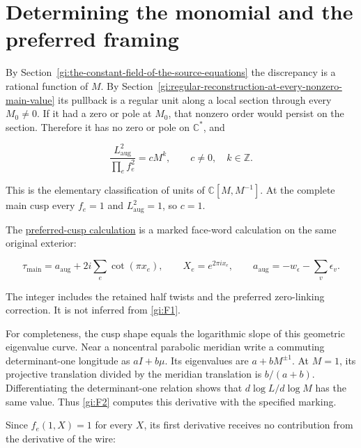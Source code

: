 \section{Determining the monomial and the preferred framing}\label{gi:determining-the-monomial-and-the-preferred-framing}

By Section~\ref{gi:the-constant-field-of-the-source-equations} the discrepancy is a rational function of \(M\).
By Section~\ref{gi:regular-reconstruction-at-every-nonzero-main-value} its pullback is a regular unit along a local section
through every \(M_0\ne0\). If it had a zero or pole at \(M_0\),
that nonzero order would persist on the section. Therefore it has
no zero or pole on \(\mathbb C^*\), and

\begin{equation}\label{gi:F1}
\frac{L_{\mathrm{aug}}^2}{\prod_e f_e^2}=cM^k,\qquad
                  c\ne0,\quad k\in\mathbb Z.
\end{equation}

This is the elementary classification of units of
\(\mathbb C[M,M^{-1}]\). At the complete main cusp every
\(f_e=1\) and \(L_{\mathrm{aug}}^2=1\), so \(c=1\).

The \href{https://sashakolpakov.github.io/murakamis_dream/notes/actual_all_circle_preferred_cusp.html}{preferred-cusp calculation}
is a marked face-word calculation on the same original exterior:

\begin{equation}\label{gi:F2}
\tau_{\mathrm{main}}
      =a_{\mathrm{aug}}+2i\sum_e\cot(\pi x_e),\qquad
 X_e=e^{2\pi ix_e},\qquad
 a_{\mathrm{aug}}=-w_\epsilon-\sum_v\epsilon_v.
\end{equation}

The integer includes the retained half twists and the preferred
zero-linking correction. It is not inferred from \eqref{gi:F1}.

For completeness, the cusp shape equals the logarithmic slope
of this geometric eigenvalue curve. Near a noncentral parabolic
meridian write a commuting determinant-one longitude as
\(aI+b\mu\). Its eigenvalues are \(a+bM^{\pm1}\).
At \(M=1\), its projective translation divided by the
meridian translation is \(b/(a+b)\). Differentiating the
determinant-one relation shows that
\(d\log L/d\log M\) has the same value. Thus \eqref{gi:F2}
computes this derivative with the specified marking.

Since \(f_e(1,X)=1\) for every \(X\), its first
derivative receives no contribution from the derivative
of the wire:

